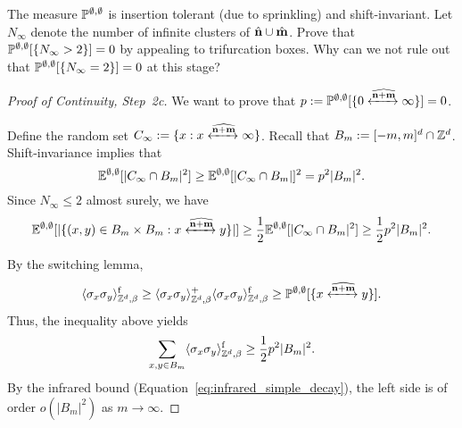 \begin{exercise}
    The measure $\P^{\emptyset,\emptyset}$ is insertion tolerant (due to sprinkling)
    and shift-invariant.
    Let $N_\infty$ denote the number of infinite clusters of $\hat\n\cup\hat\m$.
    Prove that $\P^{\emptyset,\emptyset}[\{N_\infty>2\}]=0$
    by appealing to trifurcation boxes.
    Why can we not rule out that $\P^{\emptyset,\emptyset}[\{N_\infty=2\}]=0$
    at this stage?
\end{exercise}



\begin{proof}[Proof of Continuity, Step~2c]
    We want to prove that $p:=\P^{\emptyset,\emptyset}[\{0\xleftrightarrow{\widehat{\n+\m}}\infty\}]=0$.

    Define the random set $C_\infty:=\{x:x\xleftrightarrow{\widehat{\n+\m}}\infty\}$.
    Recall that $B_m:=[-m,m]^d\cap \Z^d$.
    Shift-invariance implies that
    \[
        \E^{\emptyset,\emptyset}[|C_\infty\cap B_m|^2]
        \geq
        \E^{\emptyset,\emptyset}[|C_\infty\cap B_m|]^2
        =
        p^2|B_m|^2.
    \]
    Since $N_\infty\leq 2$ almost surely,
    we have
    \[
        \E^{\emptyset,\emptyset}[|\{(x,y)\in B_m\times B_m:x\xleftrightarrow{\widehat{\n+\m}}y\}|]
        \geq
        \frac12 \E^{\emptyset,\emptyset}[|C_\infty\cap B_m|^2]
        \geq
        \frac12 p^2 |B_m|^2.
    \]

    By the switching lemma,
    \[
        \langle\sigma_x\sigma_y\rangle_{\Z^d,\beta}^\f
        \geq
        \langle\sigma_x\sigma_y\rangle_{\Z^d,\beta}^+
        \langle\sigma_x\sigma_y\rangle_{\Z^d,\beta}^\f
        \geq
        \P^{\emptyset,\emptyset}[\{x\xleftrightarrow{\widehat{\n+\m}}y\}].
    \]
    Thus, the inequality above yields
    \[
        \sum_{x,y\in B_m}\langle\sigma_x\sigma_y\rangle_{\Z^d,\beta}^\f
        \geq \frac12 p^2 |B_m|^2.
    \]
    By 
    the infrared bound (Equation~\eqref{eq:infrared_simple_decay}),
    the left side is of order $o(|B_m|^2)$
    as $m\to\infty$.
\end{proof}
